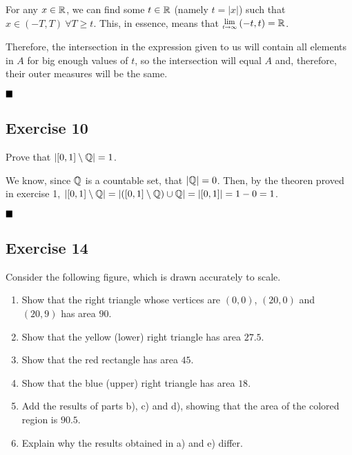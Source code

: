 For any $x\in\mathbb{R}$, we can find some $t\in\mathbb{R}$ (namely $t=|x|$) such that $x\in(-T,T)\ \forall T\geq t$. This, in essence, means that $\Lim{t\rightarrow\infty}(-t,t) = \reals$.

Therefore, the intersection in the expression given to us will contain all elements in $A$ for big enough values of $t$, so the intersection will equal $A$ and, therefore, their outer measures will be the same.

$\qed$

\subsection{Exercise 10}

\begin{formulationBox}
	Prove that $|[0,1]\setminus\mathbb{Q}| = 1$.
\end{formulationBox}

We know, since $\mathbb{Q}$ is a countable set, that $|\mathbb{Q}| = 0$. Then, by the theoren proved in exercise 1, $|[0,1]\setminus\mathbb{Q}| = |([0,1]\setminus\mathbb{Q}) \cup \mathbb{Q}| = |[0,1]| = 1-0 = 1$.

$\qed$
	
\subsection{Exercise 14}

\begin{formulationBox}
	Consider the following figure, which is drawn accurately to scale.
	
	\centering{\texttt{[image: ./2A-14-1]}}
	
	\begin{enumerate}[label=\alph*)]
		\item Show that the right triangle whose vertices are $(0,0)$, $(20, 0)$ and $(20, 9)$ has area $90$.
		\item Show that the yellow (lower) right triangle has area $27.5$.
		\item Show that the red rectangle has area $45$.
		\item Show that the blue (upper) right triangle has area $18$.
		\item Add the results of parts b), c) and d), showing that the area of the colored region is $90.5$.
		\item Explain why the results obtained in a) and e) differ.
	\end{enumerate}
\end{formulationBox}

